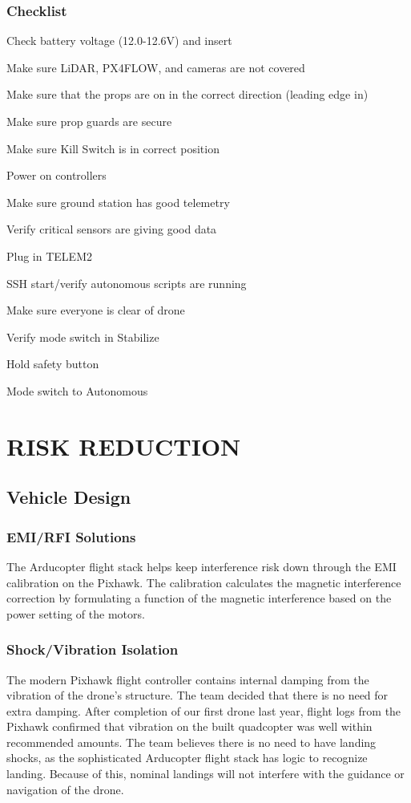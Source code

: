 \documentclass[12pt,letterpaper]{article}
\newenvironment{my_enumerate}{
	\begin{enumerate}
	\setlength{\itemsep}{1pt}
	\setlength{\parskip}{0pt}
	\setlength{\parsep}{0pt}}{\end{enumerate}
}
\begin{document}
		\subsubsection*{Checklist}
			\begin{my_enumerate}
				\item Check battery voltage (12.0-12.6V) and insert
				\item Make sure LiDAR, PX4FLOW, and cameras are not covered
				\item Make sure that the props are on in the correct direction (leading edge in)
				\item Make sure prop guards are secure
				\item Make sure Kill Switch is in correct position
				\item Power on controllers
				\item Make sure ground station has good telemetry
				\item Verify critical sensors are giving good data
				\item Plug in TELEM2
				\item SSH start/verify autonomous scripts are running
				\item Make sure everyone is clear of drone
				\item Verify mode switch in Stabilize
				\item Hold safety button
				\item Mode switch to Autonomous
			\end{my_enumerate}

\section*{RISK REDUCTION}
	\subsection*{Vehicle Design}
		\subsubsection*{EMI/RFI Solutions}
		The Arducopter flight stack helps keep interference risk down through the EMI calibration on the Pixhawk. The calibration calculates the magnetic interference correction by formulating a function of the magnetic interference based on the power setting of the motors.

		\subsubsection*{Shock/Vibration Isolation}
		The modern Pixhawk flight controller contains internal damping from the vibration of the drone's structure. The team decided that there is no need for extra damping. After completion of our first drone last year, flight logs from the Pixhawk confirmed that vibration on the built quadcopter was well within recommended amounts. The team believes there is no need to have landing shocks, as the sophisticated Arducopter flight stack has logic to recognize landing. Because of this, nominal landings will not interfere with the guidance or navigation of the drone.
\end{document}
